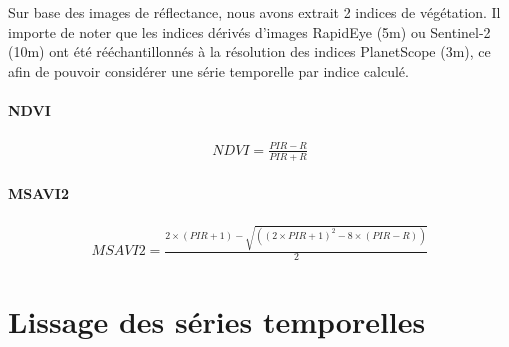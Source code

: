 Sur base des images de réflectance, nous avons extrait 2 indices de végétation. Il importe de noter que les indices dérivés d'images RapidEye (5m) ou Sentinel-2 (10m) 
ont été rééchantillonnés à la résolution des indices PlanetScope (3m), ce afin de pouvoir considérer une série temporelle par indice calculé. 

\paragraph{NDVI} \citep{Rouse1974,Tucker1979} 

\begin{align}
 NDVI = \frac{PIR - R}{PIR + R}
\end{align}

\paragraph{MSAVI2} \citep{Qi1994}

\begin{align}
 MSAVI2 = \frac{2 \times (PIR + 1) - \sqrt{((2 \times PIR + 1)^2 - 8 \times (PIR - R))}}{2}
\end{align}

\section{Lissage des séries temporelles}

